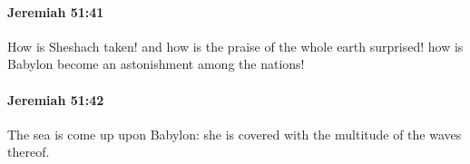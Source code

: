 		\paragraph{Jeremiah 51:41} %
			\label{JEREMIAH-51-41}

			How is Sheshach taken! and how is the praise of the whole earth surprised! how is Babylon become an astonishment among the nations!


		\paragraph{Jeremiah 51:42} %
			\label{JEREMIAH-51-42}

			The sea is come up upon Babylon: she is covered with the multitude of the waves thereof.



